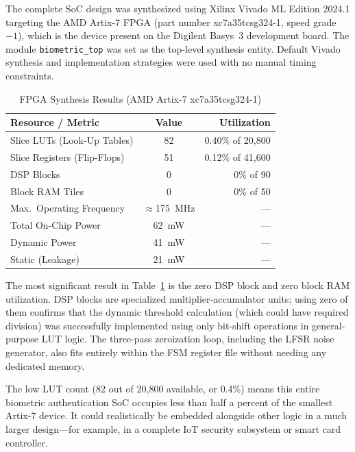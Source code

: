\documentclass[conference]{IEEEtran}
\begin{document}
The complete SoC design was synthesized using Xilinx Vivado ML Edition
2024.1 targeting the AMD Artix-7 FPGA (part number xc7a35tcsg324-1,
speed grade $-1$), which is the device present on the Digilent Basys~3
development board. The module \texttt{biometric\_top} was set as the
top-level synthesis entity. Default Vivado synthesis and implementation
strategies were used with no manual timing constraints.

\begin{table}[htbp]
\caption{FPGA Synthesis Results (AMD Artix-7 xc7a35tcsg324-1)}
\begin{center}
\begin{tabular}{|l|c|r|}
\hline
\textbf{Resource / Metric} & \textbf{Value} & \textbf{Utilization} \\
\hline
Slice LUTs (Look-Up Tables) & 82   & 0.40\% of 20,800 \\
Slice Registers (Flip-Flops)& 51   & 0.12\% of 41,600 \\
DSP Blocks                  & 0    & 0\% of 90        \\
Block RAM Tiles             & 0    & 0\% of 50        \\
Max.\ Operating Frequency   & $\approx$175~MHz & ---  \\
Total On-Chip Power         & 62~mW & ---              \\
\quad\quad Dynamic Power    & 41~mW & ---              \\
\quad\quad Static (Leakage) & 21~mW & ---              \\
\hline
\end{tabular}
\label{tab:synth}
\end{center}
\end{table}

The most significant result in Table~\ref{tab:synth} is the zero
DSP block and zero block RAM utilization. DSP blocks are specialized
multiplier-accumulator units; using zero of them confirms that the
dynamic threshold calculation (which could have required division)
was successfully implemented using only bit-shift operations in
general-purpose LUT logic. The three-pass zeroization loop, including
the LFSR noise generator, also fits entirely within the FSM register
file without needing any dedicated memory.

The low LUT count (82 out of 20,800 available, or 0.4\%) means this
entire biometric authentication SoC occupies less than half a percent
of the smallest Artix-7 device. It could realistically be embedded
alongside other logic in a much larger design---for example, in a
complete IoT security subsystem or smart card controller.
\end{document}
